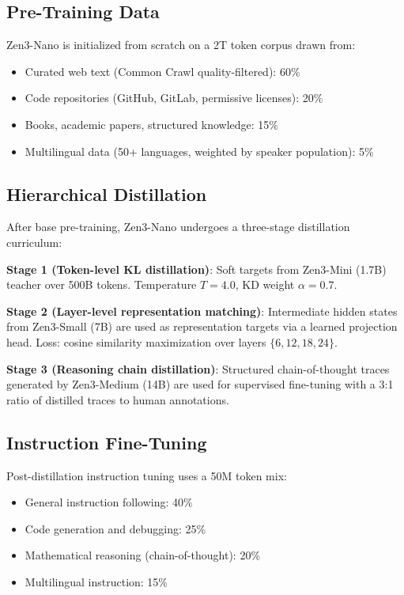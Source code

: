 \documentclass[11pt,a4paper]{article}
\begin{document}
\subsection{Pre-Training Data}

Zen3-Nano is initialized from scratch on a 2T token corpus drawn from:
\begin{itemize}
\item Curated web text (Common Crawl quality-filtered): 60\%
\item Code repositories (GitHub, GitLab, permissive licenses): 20\%
\item Books, academic papers, structured knowledge: 15\%
\item Multilingual data (50+ languages, weighted by speaker population): 5\%
\end{itemize}

\subsection{Hierarchical Distillation}

After base pre-training, Zen3-Nano undergoes a three-stage distillation curriculum:

\textbf{Stage 1 (Token-level KL distillation)}: Soft targets from Zen3-Mini (1.7B) teacher
over 500B tokens. Temperature $T=4.0$, KD weight $\alpha = 0.7$.

\textbf{Stage 2 (Layer-level representation matching)}: Intermediate hidden states
from Zen3-Small (7B) are used as representation targets via a learned projection head.
Loss: cosine similarity maximization over layers $\{6, 12, 18, 24\}$.

\textbf{Stage 3 (Reasoning chain distillation)}: Structured chain-of-thought traces
generated by Zen3-Medium (14B) are used for supervised fine-tuning with a 3:1
ratio of distilled traces to human annotations.

\subsection{Instruction Fine-Tuning}

Post-distillation instruction tuning uses a 50M token mix:
\begin{itemize}
\item General instruction following: 40\%
\item Code generation and debugging: 25\%
\item Mathematical reasoning (chain-of-thought): 20\%
\item Multilingual instruction: 15\%
\end{itemize}
\end{document}
